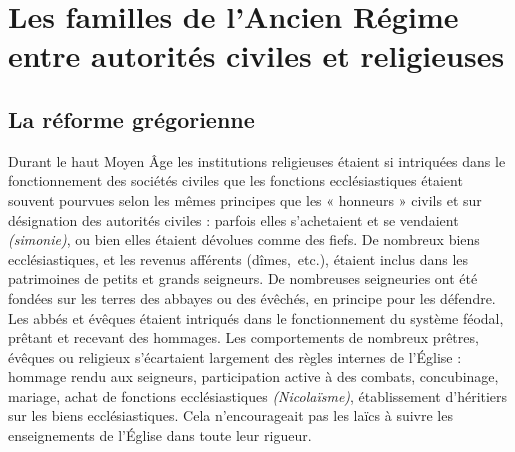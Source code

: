 

\chapter[Les familles de l'Ancien Régime entre autorités civiles et religieuses]{Les familles de l'Ancien Régime\\entre autorités civiles et religieuses}


\section{La réforme grégorienne}

 Durant le haut Moyen Âge les institutions religieuses étaient si intriquées dans le fonctionnement des sociétés civiles que les fonctions ecclésiastiques étaient souvent pourvues selon les mêmes principes que les « honneurs » civils et sur désignation des autorités civiles : parfois elles s'achetaient et se vendaient \emph{(simonie)}, ou bien elles étaient dévolues comme des fiefs. De nombreux biens ecclésiastiques, et les revenus afférents (dîmes,~etc.), étaient inclus dans les patrimoines de petits et grands seigneurs. De nombreuses seigneuries ont été fondées sur les terres des abbayes ou des évêchés, en principe pour les défendre. Les abbés et évêques étaient intriqués dans le fonctionnement du système féodal, prêtant et recevant des hommages. Les comportements de nombreux prêtres, évêques ou religieux s'écartaient largement des règles internes de l'Église : hommage rendu aux seigneurs, participation active à des combats, concubinage, mariage, achat de fonctions ecclésiastiques \emph{(Nicolaïsme)}, établissement d'héritiers sur les biens ecclésiastiques. Cela n'encourageait pas les laïcs à suivre les enseignements de l'Église dans toute leur rigueur. 

